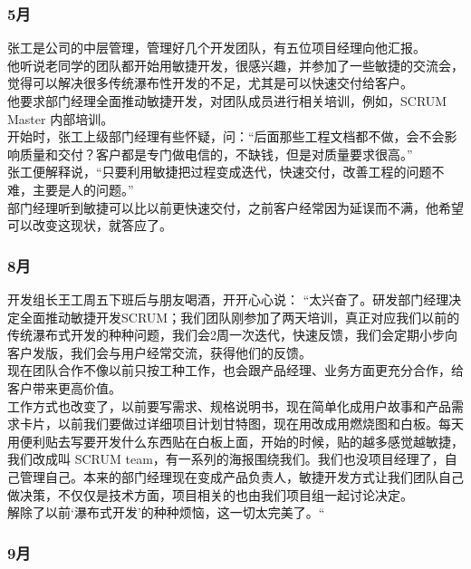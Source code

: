 \documentclass{book}        %
\begin{document}
\hypertarget{ux6708}{%
\subsubsection{5月}\label{ux6708}}

张工是公司的中层管理，管理好几个开发团队，有五位项目经理向他汇报。\\
他听说老同学的团队都开始用敏捷开发，很感兴趣，并参加了一些敏捷的交流会，觉得可以解决很多传统瀑布性开发的不足，尤其是可以快速交付给客户。\\
他要求部门经理全面推动敏捷开发，对团队成员进行相关培训，例如，SCRUM Master 内部培训。\\
开始时，张工上级部门经理有些怀疑，问：“后面那些工程文档都不做，会不会影响质量和交付？客户都是专门做电信的，不缺钱，但是对质量要求很高。”\\
张工便解释说，“只要利用敏捷把过程变成迭代，快速交付，改善工程的问题不难，主要是人的问题。”\\
部门经理听到敏捷可以比以前更快速交付，之前客户经常因为延误而不满，他希望可以改变这现状，就答应了。 \\

\hypertarget{ux6708-1}{%
\subsubsection{8月}\label{ux6708-1}}

开发组长王工周五下班后与朋友喝酒，开开心心说： “太兴奋了。研发部门经理决定全面推动敏捷开发SCRUM；我们团队刚参加了两天培训，真正对应我们以前的传统瀑布式开发的种种问题，我们会2周一次迭代，快速反馈，我们会定期小步向客户发版，我们会与用户经常交流，获得他们的反馈。\\
现在团队合作不像以前只按工种工作，也会跟产品经理、业务方面更充分合作，给客户带来更高价值。\\
工作方式也改变了，以前要写需求、规格说明书，现在简单化成用户故事和产品需求卡片，以前我们要做过详细项目计划甘特图，现在用改成用燃烧图和白板。每天用便利贴去写要开发什么东西贴在白板上面，开始的时候，贴的越多感觉越敏捷，我们改成叫 SCRUM team，有一系列的海报围绕我们。我们也没项目经理了，自己管理自己。本来的部门经理现在变成产品负责人，敏捷开发方式让我们团队自己做决策，不仅仅是技术方面，项目相关的也由我们项目组一起讨论决定。\\
解除了以前‘瀑布式开发’的种种烦恼，这一切太完美了。“\\

\hypertarget{ux6708-2}{%
\subsubsection{9月}\label{ux6708-2}}
\end{document}
